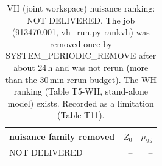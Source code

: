 \begin{table}[ht]\centering\small
\begin{tabular}{lrr}\hline
nuisance family removed & $Z_0$ & $\mu_{95}$ \\\hline
NOT DELIVERED & -- & -- \\\hline
\end{tabular}
\caption{VH (joint workspace) nuisance ranking: NOT DELIVERED. The job (913470.001, vh\_run.py rankvh) was removed once by SYSTEM\_PERIODIC\_REMOVE after about 24\,h and was not rerun (more than the 30\,min rerun budget). The WH ranking (Table T5-WH, stand-alone model) exists. Recorded as a limitation (Table T11).}
\end{table}
